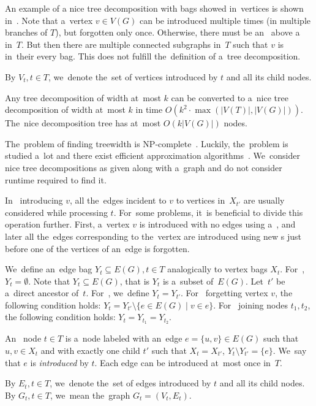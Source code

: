 An example of a nice tree decomposition with bags showed in~vertices
is shown in~.
%
Note that a~vertex \( v \in V(G) \) can be introduced multiple times
(in multiple branches of \( T \)),
but forgotten only once.
%
Otherwise, there must be an~\IntroduceVertexNode{} above a~\ForgetVertexNode{} in~\( T \).
But then there are multiple connected subgraphs in~\( T \)
such that \( v \) is in~their every bag.
This does not fulfill the~definition of a~tree decomposition.

By \( V_t, t \in T \), we~denote the~set of vertices introduced by \( t \)
and all its child nodes.
%
\begin{lemma}
	Any tree decomposition of width at~most \( k \) can be converted to
	a~nice tree decomposition of width at~most \( k \)
	in time \( O(k^2 \cdot \max(|V(T)|, |V(G)|)) \).
	The~nice decomposition tree has at~most \( O(k|V(G)|) \) nodes.
\end{lemma}

The~problem of finding treewidth is NP-complete~\cite{tree_width_np_complete}.
Luckily, the~problem is studied a~lot and
there exist efficient approximation algorithms~\cite{tree_width_approximation}.
We~consider nice tree decompositions as given along with a~graph
and do not consider runtime required to find it.

In~\IntroduceVertexNode{} introducing \( v \), all the~edges incident to \( v \)
to vertices in~\( X_{t'} \) are usually considered while processing \( t \).
%
For~some problems, it~is beneficial to divide this operation further.
First, a~vertex \( v \) is introduced with no edges using a~\IntroduceVertexNode{},
and later all the~edges corresponding to the~vertex are introduced using new \IntroduceEdgeNode{}s
just before one of the vertices of an~edge is forgotten.

We~define an~edge bag \( Y_t \subseteq E(G), t \in T \) analogically to vertex bags \( X_t \).
%
For~\LeafNode{}, \( Y_t = \emptyset \).
%
Note that \( Y_t \subseteq E(G) \), that is \( Y_t \) is a~subset of~\( E(G) \).
Let~\( t' \) be a~direct ancestor of~\( t \).
For~\IntroduceVertexNode{}, we~define \( Y_t = Y_{t'} \).
For~\ForgetVertexNode{} forgetting vertex \( v \),
the following condition holds: \( Y_t = Y_{t'} \setminus \{ e \in E(G) \mid v \in e\} \).
For~\JoinNode{} joining nodes \( t_1, t_2 \),
the following condition holds: \( Y_t = Y_{t_1} = Y_{t_2} \).
%
\begin{definition}
	An~\IntroduceEdgeNode{} node \( t \in T \) is a~node
	labeled with an~edge \( e = \{u, v\} \in E(G) \)
	such that \( u, v \in X_t \) and with exactly one child \( t' \)
	such that \( X_t = X_{t'} \), \( Y_t \setminus Y_{t'} = \{e\} \).
	We~say that \( e \) is \emph{introduced} by \( t \).
	Each edge can be introduced at~most once in~\( T \).
\end{definition}
%
By \( E_t, t \in T \), we~denote the~set of edges introduced by \( t \)
and all its child nodes.
By \( G_t, t \in T \), we~mean the~graph \( G_t = (V_t, E_t) \).

